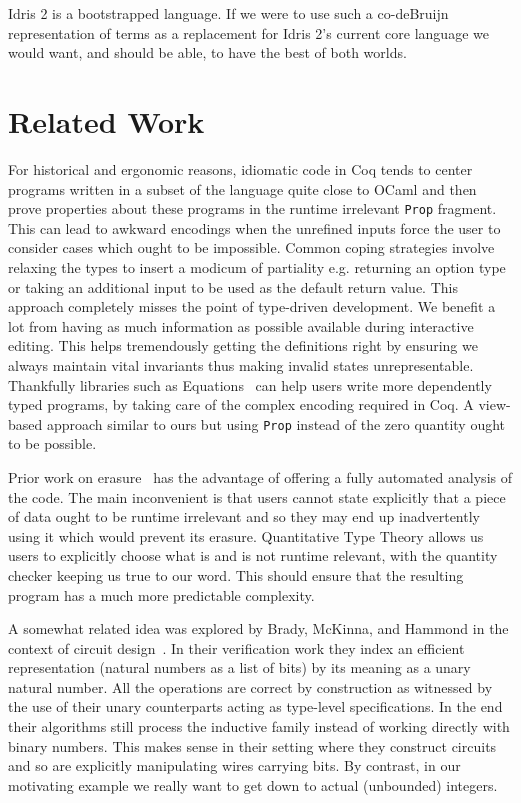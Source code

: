 \documentclass{article}
\newcommand{\idris}{Idris 2}
\newcommand{\coq}{Coq}
\begin{document}
\idris{} is a bootstrapped language. If we were to use such a co-deBruijn representation
of terms as a replacement for \idris{}'s current core language we would want, and should
be able, to have the best of both worlds.



\section{Related Work}

For historical and ergonomic reasons, idiomatic code in \coq{} tends to center programs
written in a subset of the language quite close to OCaml and then prove properties
about these programs in the runtime irrelevant \texttt{Prop} fragment.
%
This can lead to awkward encodings when the unrefined inputs force the user to consider
cases which ought to be impossible. Common coping strategies involve relaxing the types
to insert a modicum of partiality e.g. returning an option type or taking an additional
input to be used as the default return value.
%
This approach completely misses the point of type-driven development. We benefit a lot
from having as much information as possible available during interactive editing. This
helps tremendously getting the definitions right by ensuring we always maintain vital
invariants thus making invalid states unrepresentable.
%
Thankfully libraries such as Equations~\cite{DBLP:conf/itp/Sozeau10,DBLP:journals/pacmpl/SozeauM19}
can help users write more dependently typed programs, by taking care of the complex
encoding required in \coq{}. A view-based approach similar to ours but using \texttt{Prop}
instead of the zero quantity ought to be possible.

Prior work on erasure~\cite{DBLP:journals/pacmpl/Tejiscak20} has the advantage of
offering a fully automated analysis of the code. The main inconvenient is that users
cannot state explicitly that a piece of data ought to be runtime irrelevant and so
they may end up inadvertently using it which would prevent its erasure.
%
Quantitative Type Theory allows us users to explicitly choose what is and is not
runtime relevant, with the quantity checker keeping us true to our word.
%
This should ensure that the resulting program has a much more predictable complexity.

A somewhat related idea was explored by Brady, McKinna, and Hammond in the context of
circuit design~\cite{DBLP:conf/sfp/BradyMH07}. In their verification work they index
an efficient representation (natural numbers as a list of bits) by its meaning as a
unary natural number. All the operations are correct by construction as witnessed by
the use of their unary counterparts acting as type-level specifications.
%
In the end their algorithms still process the inductive family instead of working
directly with binary numbers. This makes sense in their setting where they construct
circuits and so are explicitly manipulating wires carrying bits.
%
By contrast, in our motivating example we really want to get down to actual (unbounded)
integers.
\end{document}
